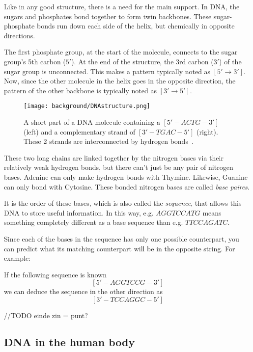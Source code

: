 Like in any good structure, there is a need for the main support. In DNA, the sugars and phosphates bond together to form twin backbones. These sugar-phosphate bonds run down each side of the helix, but chemically in opposite directions. 

The first phosphate group, at the start of the molecule, connects to the sugar group's 5th carbon ($5'$). At the end of the structure, the 3rd carbon ($3'$) of the sugar group is unconnected. This makes a pattern typically noted as $[5' \rightarrow 3']$. Now, since the other molecule in the helix goes in the opposite direction, the pattern of the other backbone is typically noted as $[3' \rightarrow 5']$.

\begin{figure}[H]
	\centering
	\texttt{[image: background/DNAstructure.png]}
	\caption{A short part of a DNA molecule containing a $[5' - ACTG - 3']$ (left) and a complementary strand of $[3' - TGAC - 5']$ (right). These 2 strands are interconnected by hydrogen bonds~\cite{dnachemical}.}
	\label{fig:DNAstructure}
\end{figure}

These two long chains are linked together by the nitrogen bases via their relatively weak hydrogen bonds, but there can't just be any pair of nitrogen bases. Adenine can only make hydrogen bonds with Thymine. Likewise, Guanine can only bond with Cytosine. These bonded nitrogen bases are called \emph{base paires}.

It is the order of these bases, which is also called the \emph{sequence}, that allows this DNA to store useful information. In this way, e.g. $AGGTCCATG$ means something completely different as a base sequence than e.g. $TTCCAGATC$.

Since each of the bases in the sequence has only one possible counterpart, you can predict what its matching counterpart will be in the opposite string. For example:

If the following sequence is known
$$[5' - AGGTCCG - 3']$$
we can deduce the sequence in the other direction as
$$[3' - TCCAGGC - 5']$$

//TODO einde zin = punt?

\subsection{DNA in the human body}

